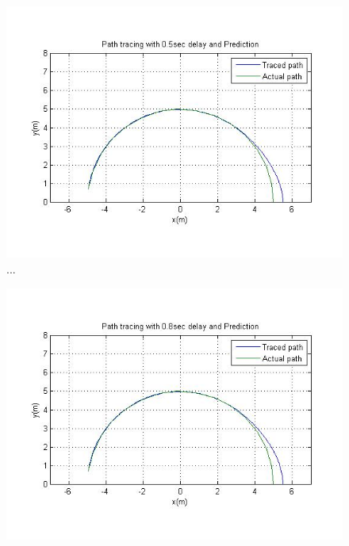  \begin{figure}[h]
 	 \begin{minipage}[T]{0.5\linewidth}
 	 	\centering
 		\includegraphics[width=\linewidth,keepaspectratio]{Chapter7/fig/withPrediction05dely}
 		\label{fig:PreDelay500plot} ...
 	\end{minipage}
 \hfill
 	\begin{minipage}[T]{0.5\linewidth}
 		\centering
		\includegraphics[width=\linewidth,keepaspectratio]{Chapter7/fig/withPrediction08delay}
		\label{fig:PreDelay800plot} 
 	\end{minipage}
 \end{figure} 


